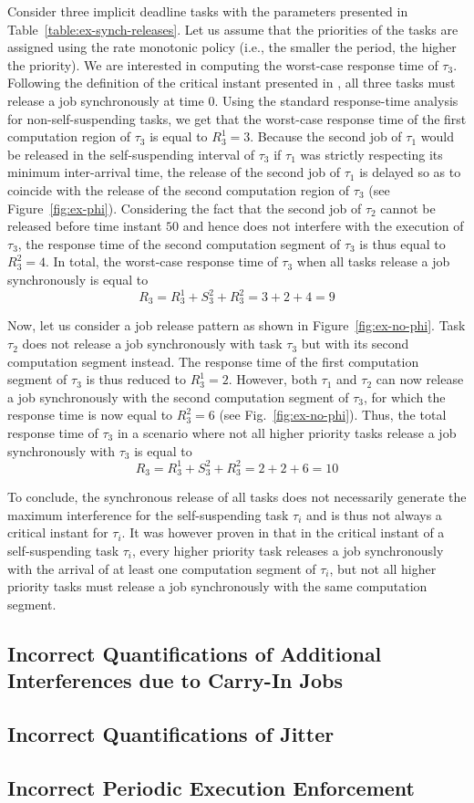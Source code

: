 Consider three implicit deadline tasks with the parameters presented in Table~\ref{table:ex-synch-releases}. Let us assume that the priorities of the tasks are assigned using the rate monotonic policy (i.e., the smaller the period, the higher the priority). We are interested in computing the worst-case response time of $\tau_3$. Following the definition of the critical instant presented in \cite{RTAS-LakshmananR10}, all three tasks must release a job synchronously at time $0$. Using the standard response-time analysis for non-self-suspending tasks, we get that the worst-case response time of the first computation region of $\tau_3$ is equal to $R_3^1 = 3$. Because the second job of $\tau_1$ would be released in the self-suspending interval of $\tau_3$ if $\tau_1$ was strictly respecting its minimum inter-arrival time, the release of the second job of $\tau_1$ is delayed so as to coincide with the release of the second computation region of $\tau_3$ (see Figure~\ref{fig:ex-phi}). Considering the fact that the second job of $\tau_2$ cannot be released before time instant $50$ and hence does not interfere with the execution of $\tau_3$, the response time of the second computation segment of $\tau_3$ is thus equal to $R_3^2=4$. In total, the worst-case response time of $\tau_3$ when all tasks release a job synchronously is equal to 
$$R_3 = R_3^1 + S_3^2 + R_3^2 = 3 + 2 +4 = 9$$

Now, let us consider a job release pattern as shown in Figure~\ref{fig:ex-no-phi}. Task $\tau_2$ does not release a job synchronously with task $\tau_3$ but with its second computation segment instead. The response time of the first computation segment of $\tau_3$ is thus reduced to $R_3^1=2$. However, both $\tau_1$ and $\tau_2$ can now release a job synchronously with the second computation segment of $\tau_3$, for which the response time is now equal to $R_3^2=6$ (see Fig.~\ref{fig:ex-no-phi}). Thus, the total response time of $\tau_3$ in a scenario where not all higher priority tasks release a job synchronously with $\tau_3$ is equal to 
$$R_3 = R_3^1 + S_3^2 + R_3^2 = 2+2+6 = 10$$

To conclude, the synchronous release of all tasks does not necessarily generate the maximum interference for the self-suspending task $\tau_i$ and is thus not always a critical instant for $\tau_i$. It was however proven in \cite{ecrts15nelissen} that in the critical instant of a self-suspending task $\tau_i$, every higher priority task releases a job synchronously with the arrival of at least one computation segment of $\tau_i$, but not all higher priority tasks must release a job synchronously with the same computation segment.

\subsection{Incorrect Quantifications of Additional Interferences due to Carry-In Jobs}
\label{sec:wrong-carryin}

\subsection{Incorrect Quantifications of Jitter}
\label{sec:wrong-jitter}


\subsection{Incorrect Periodic Execution Enforcement}
\label{sec:wrong-periodic}



